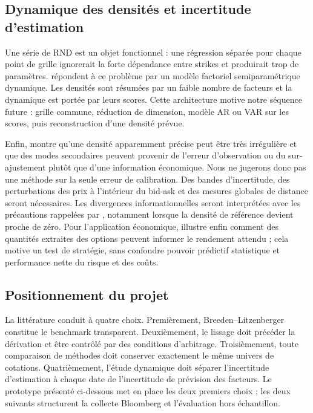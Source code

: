 \documentclass[11pt,a4paper]{article}
\numberwithin{equation}{section}
\begin{document}
\subsection{Dynamique des densités et incertitude d'estimation}
Une série de RND est un objet fonctionnel : une régression séparée pour chaque point de
grille ignorerait la forte dépendance entre strikes et produirait trop de paramètres.
\citet{giacomini_et_al_2009} répondent à ce problème par un modèle factoriel
semiparamétrique dynamique. Les densités sont résumées par un faible nombre de facteurs
et la dynamique est portée par leurs scores. Cette architecture motive notre séquence
future : grille commune, réduction de dimension, modèle AR ou VAR sur les scores, puis
reconstruction d'une densité prévue.

Enfin, \citet{taboga_2016} montre qu'une densité apparemment précise peut être très
irrégulière et que des modes secondaires peuvent provenir de l'erreur d'observation ou
du sur-ajustement plutôt que d'une information économique. Nous ne jugerons donc pas une
méthode sur la seule erreur de calibration. Des bandes d'incertitude, des perturbations
des prix à l'intérieur du bid-ask et des mesures globales de distance seront nécessaires.
Les divergences informationnelles seront interprétées avec les précautions rappelées par
\citet{cover_thomas_1991}, notamment lorsque la densité de référence devient proche
de zéro. Pour l'application économique, \citet{martin_2017} illustre enfin comment
des quantités extraites des options peuvent informer le rendement attendu ; cela motive
un test de stratégie, sans confondre pouvoir prédictif statistique et performance nette
du risque et des coûts.

\subsection{Positionnement du projet}
La littérature conduit à quatre choix. Premièrement, Breeden--Litzenberger constitue le
benchmark transparent. Deuxièmement, le lissage doit précéder la dérivation et être
contrôlé par des conditions d'arbitrage. Troisièmement, toute comparaison de méthodes
doit conserver exactement le même univers de cotations. Quatrièmement, l'étude dynamique
doit séparer l'incertitude d'estimation à chaque date de l'incertitude de prévision des
facteurs. Le prototype présenté ci-dessous met en place les deux premiers choix ; les
deux suivants structurent la collecte Bloomberg et l'évaluation hors échantillon.
\end{document}
